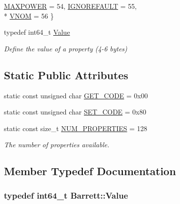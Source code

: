 \begin{DoxyCompactItemize}
\hyperlink{struct_barrett_a317dfaed9982ffc28166e537d774bd16a20b434dfd051fcbe27d1bd12fb161ae6}{M\-A\-X\-P\-O\-W\-E\-R} = 54, 
\hyperlink{struct_barrett_a317dfaed9982ffc28166e537d774bd16a782bc07a01d45831942deff61bfe8da8}{I\-G\-N\-O\-R\-E\-F\-A\-U\-L\-T} = 55, 
\\*
\hyperlink{struct_barrett_a317dfaed9982ffc28166e537d774bd16ae504abf13f6ff4532d56098d89d748f5}{V\-N\-O\-M} = 56
 \}
\item 
typedef int64\-\_\-t \hyperlink{struct_barrett_a57ff132885344ca62e4b4b691885685b}{Value}
\begin{DoxyCompactList}\small\item\em Define the value of a property (4-\/6 bytes) \end{DoxyCompactList}\end{DoxyCompactItemize}
\subsection*{Static Public Attributes}
\begin{DoxyCompactItemize}
\item 
static const unsigned char \hyperlink{struct_barrett_ad52fc21a0b1d02fa2dfd0b9f47c63439}{G\-E\-T\-\_\-\-C\-O\-D\-E} = 0x00
\item 
static const unsigned char \hyperlink{struct_barrett_a746e1d4f09073391ae23fecb646ab0f9}{S\-E\-T\-\_\-\-C\-O\-D\-E} = 0x80
\item 
static const size\-\_\-t \hyperlink{struct_barrett_a3b28e2fed33c0ad184808bbed86551c0}{N\-U\-M\-\_\-\-P\-R\-O\-P\-E\-R\-T\-I\-E\-S} = 128
\begin{DoxyCompactList}\small\item\em The number of properties available. \end{DoxyCompactList}\end{DoxyCompactItemize}


\subsection{Member Typedef Documentation}
\hypertarget{struct_barrett_a57ff132885344ca62e4b4b691885685b}{
\subsubsection[{Value}]{\setlength{\rightskip}{0pt plus 5cm}typedef int64\-\_\-t {\bf Barrett\-::\-Value}}}\label{struct_barrett_a57ff132885344ca62e4b4b691885685b}


